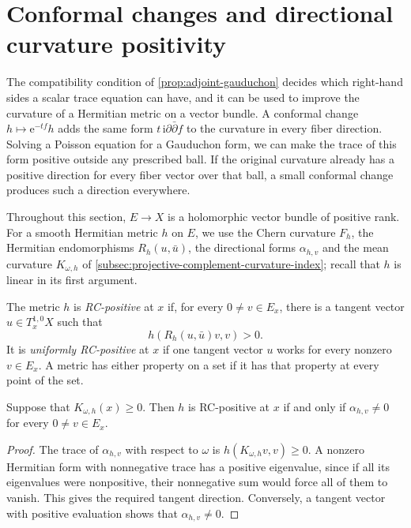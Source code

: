 \section{Conformal changes and directional curvature positivity}
\label{sec:gauduchon-directional-curvature}

The compatibility condition of \cref{prop:adjoint-gauduchon} decides which right-hand sides a scalar trace equation can have, and it can be used to improve the curvature of a Hermitian metric on a vector bundle. A conformal change $h\mapsto\mathrm e^{-tf}h$ adds the same form $t\,\mathrm i\partial\bar\partial f$ to the curvature in every fiber direction. Solving a Poisson equation for a Gauduchon form, we can make the trace of this form positive outside any prescribed ball. If the original curvature already has a positive direction for every fiber vector over that ball, a small conformal change produces such a direction everywhere.

Throughout this section, $E\to X$ is a holomorphic vector bundle of positive rank. For a smooth Hermitian metric $h$ on $E$, we use the Chern curvature $F_h$, the Hermitian endomorphisms $R_h(u,\bar u)$, the directional forms $\alpha_{h,v}$ and the mean curvature $K_{\omega,h}$ of \cref{subsec:projective-complement-curvature-index}; recall that $h$ is linear in its first argument.

\begin{definition}\label{def:directional-rc-positivity}
The metric $h$ is \emph{RC-positive} at $x$ if, for every $0\ne v\in E_x$, there is a tangent vector $u\in T_x^{1,0}X$ such that
\[
 h(R_h(u,\bar u)v,v)>0.
\]
It is \emph{uniformly RC-positive} at $x$ if one tangent vector $u$ works for every nonzero $v\in E_x$. A metric has either property on a set if it has that property at every point of the set.
\end{definition}

\begin{lemma}\label{lem:semipositive-mean-rc-criterion}
Suppose that $K_{\omega,h}(x)\geq0$. Then $h$ is RC-positive at $x$ if and only if $\alpha_{h,v}\ne0$ for every $0\ne v\in E_x$.
\end{lemma}
\begin{proof}
The trace of $\alpha_{h,v}$ with respect to $\omega$ is $h(K_{\omega,h}v,v)\geq0$. A nonzero Hermitian form with nonnegative trace has a positive eigenvalue, since if all its eigenvalues were nonpositive, their nonnegative sum would force all of them to vanish. This gives the required tangent direction. Conversely, a tangent vector with positive evaluation shows that $\alpha_{h,v}\ne0$.
\end{proof}

